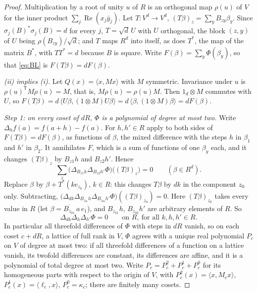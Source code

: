 \begin{proof}
Multiplication by a root of unity $u$ of $R$ is an orthogonal map $\rho(u)$ of $V$ for the inner product $\sum_j\operatorname{Re}(x_j\bar y_j)$. Let $T\colon V^d\to V^d$, $(T\beta)_z=\sum_yB_{zy}\beta_y$. Since $\sigma_j(B)^*\sigma_j(B)=d$ for every $j$, $T=\sqrt d\,U$ with $U$ orthogonal, the block $(z,y)$ of $U$ being $\rho(B_{zy})/\sqrt d$; and $T$ maps $R^d$ into itself, as does $T^*$, the map of the matrix $B^*$, with $TT^*=d$ because $B$ is square. Write $F(\beta)=\sum_y\Phi(\beta_y)$, so that \eqref{eq:BL} is $F(T\beta)=dF(\beta)$.

\emph{(ii) implies (i).} Let $Q(x)=\langle x,Mx\rangle$ with $M$ symmetric. Invariance under $u$ is $\rho(u)^{\mathsf T}M\rho(u)=M$, that is, $M\rho(u)=\rho(u)M$. Then $1_d\otimes M$ commutes with $U$, so $F(T\beta)=d\,\langle U\beta,(1\otimes M)U\beta\rangle=d\,\langle\beta,(1\otimes M)\beta\rangle=dF(\beta)$.

\emph{Step 1: on every coset of $dR$, $\Phi$ is a polynomial of degree at most two.} Write $\Delta_hf(a)=f(a+h)-f(a)$. For $h,h'\in R$ apply to both sides of $F(T\beta)=dF(\beta)$, as functions of $\beta$, the mixed difference with the steps $h$ in $\beta_1$ and $h'$ in $\beta_2$. It annihilates $F$, which is a sum of functions of one $\beta_y$ each, and it changes $(T\beta)_z$ by $B_{z1}h$ and $B_{z2}h'$. Hence
\[
\sum_z\bigl(\Delta_{B_{z1}h}\Delta_{B_{z2}h'}\Phi\bigr)\bigl((T\beta)_z\bigr)=0\qquad(\beta\in R^d).
\]
Replace $\beta$ by $\beta+T^*(ke_{z_0})$, $k\in R$: this changes $T\beta$ by $dk$ in the component $z_0$ only. Subtracting, $\bigl(\Delta_{dk}\Delta_{B_{z_01}h}\Delta_{B_{z_02}h'}\Phi\bigr)((T\beta)_{z_0})=0$. Here $(T\beta)_{z_0}$ takes every value in $R$ (let $\beta=\overline{B_{z_01}}\,a\,e_1$), and $B_{z_01}h$, $B_{z_02}h'$ are arbitrary elements of $R$. So
\begin{equation}\label{eq:third}
\Delta_{dk}\Delta_h\Delta_{h'}\Phi=0\qquad\text{on }R,\ \text{for all }k,h,h'\in R .
\end{equation}
In particular all threefold differences of $\Phi$ with steps in $dR$ vanish, so on each coset $c+dR$, a lattice of full rank in $V$, $\Phi$ agrees with a unique real polynomial $P_c$ on $V$ of degree at most two: if all threefold differences of a function on a lattice vanish, its twofold differences are constant, its differences are affine, and it is a polynomial of total degree at most two. Write $P_c=P_c^{2}+P_c^{1}+P_c^{0}$ for its homogeneous parts with respect to the origin of $V$, with $P^2_c(x)=\langle x,M_cx\rangle$, $P^1_c(x)=\langle\ell_c,x\rangle$, $P^0_c=\kappa_c$; there are finitely many cosets.


\end{proof}
